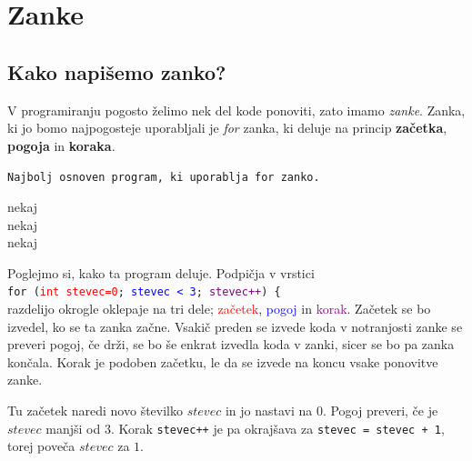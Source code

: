 \documentclass{book}
\begin{document}
\chapter{Zanke}

\section{Kako napišemo zanko?}

V programiranju pogosto želimo nek del kode ponoviti, zato imamo \emph{zanke}.
Zanka, ki jo bomo najpogosteje uporabljali je \emph{for} zanka,
ki deluje na princip \textbf{začetka}, \textbf{pogoja} in \textbf{koraka}.
\begin{examples}
\verb+Najbolj osnoven program, ki uporablja for zanko.+


\begin{inout}
	nekaj \\
	nekaj \\
	nekaj
\end{inout}

\end{examples}

Poglejmo si, kako ta program deluje. Podpičja v vrstici \\
\texttt{for~({\textcolor{red}{int~stevec=0}};~\textcolor{blue}{stevec~<~3};~\textcolor{purple}{stevec++})~\{} \\
razdelijo okrogle oklepaje na tri dele; \textcolor{red}{začetek},
\textcolor{blue}{pogoj} in \textcolor{purple}{korak}.
Začetek se bo izvedel, ko se ta zanka začne. Vsakič preden se izvede koda
v notranjosti zanke se preveri pogoj, če drži,
se bo še enkrat izvedla koda v zanki, sicer se bo pa zanka končala.
Korak je podoben začetku, le da se izvede na koncu vsake ponovitve zanke.

Tu začetek naredi novo številko $stevec$ in jo nastavi na $0$.
Pogoj preveri, če je $stevec$ manjši od $3$. Korak \texttt{stevec++} je pa
okrajšava za \texttt{stevec = stevec + 1}, torej poveča $stevec$ za $1$.
\end{document}

